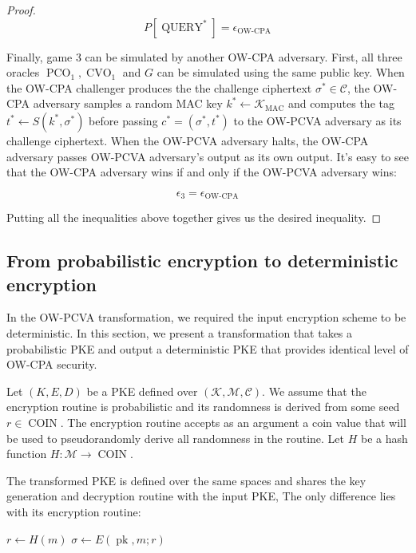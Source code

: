 \documentclass{article}
\newcommand{\pk}{\operatorname{pk}}
\newcommand{\pco}{\operatorname{PCO}}
\newcommand{\cvo}{\operatorname{CVO}}
\newcommand{\coin}{\operatorname{COIN}}
\newlength{\wdth}
\newcommand{\strike}[1]{\settowidth{\wdth}{#1}\rlap{\rule[.5ex]{\wdth}{.4pt}}#1}
\begin{document}
\begin{proof}
    \begin{equation*}
        P[\operatorname{QUERY}^\ast] = \epsilon_\text{OW-CPA}
    \end{equation*}

    Finally, game 3 can be simulated by another OW-CPA adversary. First, all three oracles $\pco_1, \cvo_1$ and $G$ can be simulated using the same public key. When the OW-CPA challenger produces the the challenge ciphertext $\sigma^\ast \in \mathcal{C}$, the OW-CPA adversary samples a random MAC key $k^\ast \leftarrow \mathcal{K}_\text{MAC}$ and computes the tag $t^\ast \leftarrow S(k^\ast, \sigma^\ast)$ before passing $c^\ast = (\sigma^\ast, t^\ast)$ to the OW-PCVA adversary as its challenge ciphertext. When the OW-PCVA adversary halts, the OW-CPA adversary passes OW-PCVA adversary's output as its own output. It's easy to see that the OW-CPA adversary wins if and only if the OW-PCVA adversary wins:

    \begin{equation*}
        \epsilon_3 = \epsilon_\text{OW-CPA}
    \end{equation*}

    Putting all the inequalities above together gives us the desired inequality.
\end{proof}

\subsection{From probabilistic encryption to deterministic encryption}
In the OW-PCVA transformation, we required the input encryption scheme to be deterministic. In this section, we present a transformation that takes a probabilistic PKE and output a deterministic PKE that provides identical level of OW-CPA security.

Let $(K, E, D)$ be a PKE defined over $(\mathcal{K}, \mathcal{M}, \mathcal{C})$. We assume that the encryption routine is probabilistic and its randomness is derived from some seed $r \in \coin$. The encryption routine accepts as an argument a coin value that will be used to pseudorandomly derive all randomness in the routine. Let $H$ be a hash function $H: \mathcal{M} \rightarrow \coin$.

The transformed PKE is defined over the same spaces and shares the key generation and decryption routine with the input PKE, The only difference lies with its encryption routine:

\begin{algorithm}[H]
    \caption{$E^{\strike{\$}}$}
    \SetAlgoLined
    \KwIn{
        $(\pk, m)$
    }
    $r \leftarrow H(m)$\;
    $\sigma \leftarrow E(\pk, m; r)$\;
    \Return{$\sigma$}
\end{algorithm}
\end{document}
